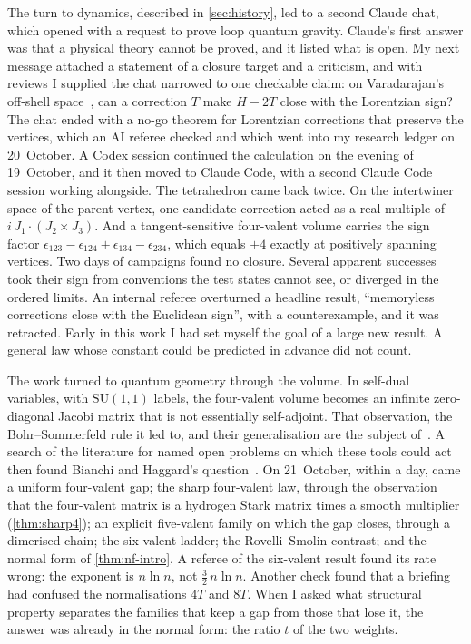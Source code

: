 The turn to dynamics, described in \cref{sec:history}, led to a second Claude chat, which
opened with a request to prove loop quantum gravity. Claude's first answer was that a
physical theory cannot be proved, and it listed what is open. My next message attached a
statement of a closure target and a criticism, and with reviews I supplied the chat
narrowed to one checkable claim: on Varadarajan's off-shell space~\cite{Varadarajan2022}, can
a correction $T$ make $H-2T$ close with the Lorentzian sign? The chat ended with a no-go
theorem for Lorentzian corrections that preserve the vertices, which an AI referee checked
and which went into my research ledger on 20~October. A Codex session continued the
calculation on the evening of 19~October, and it then moved to Claude Code, with a second Claude
Code session working alongside. The tetrahedron came back twice. On the intertwiner space of
the parent vertex, one candidate correction acted as a real multiple of
$i\,J_1\cdot(J_2\times J_3)$. And a tangent-sensitive four-valent volume carries the sign
factor $\epsilon_{123}-\epsilon_{124}+\epsilon_{134}-\epsilon_{234}$, which equals $\pm4$
exactly at positively spanning vertices. Two days of campaigns found no closure. Several
apparent successes took their sign from conventions the test states cannot see, or diverged
in the ordered limits. An internal referee overturned a headline result, ``memoryless
corrections close with the Euclidean sign'', with a counterexample, and it was retracted.
Early in this work I had set myself the goal of a large new result. A general law whose
constant could be predicted in advance did not count.

The work turned to quantum geometry through the volume. In self-dual variables, with
$\mathrm{SU}(1,1)$ labels, the four-valent volume becomes an infinite zero-diagonal Jacobi
matrix that is not essentially self-adjoint. That observation, the Bohr--Sommerfeld rule it
led to, and their generalisation are the subject of~\cite{FitchLimitCircle}. A search of
the literature for named open problems on which these tools could act then found Bianchi
and Haggard's question~\cite{BH2011}. On 21~October, within a day, came a uniform
four-valent gap; the sharp four-valent law, through the observation that the four-valent
matrix is a hydrogen Stark matrix times a smooth multiplier (\cref{thm:sharp4}); an
explicit five-valent family on which the gap closes, through a dimerised chain; the
six-valent ladder; the Rovelli--Smolin contrast; and the normal form of
\cref{thm:nf-intro}. A referee of the six-valent result found its rate wrong: the exponent
is $n\ln n$, not $\frac32\,n\ln n$. Another check found that a briefing had confused the
normalisations $4T$ and $8T$. When I asked what structural property separates the families
that keep a gap from those that lose it, the answer was already in the normal form: the
ratio $t$ of the two weights.

